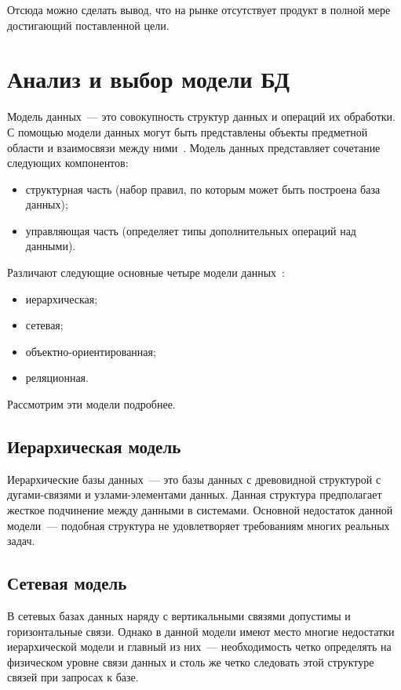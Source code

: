 Отсюда можно сделать вывод, что на рынке отсутствует продукт в полной мере достигающий поставленной цели.

\section{Анализ и выбор модели БД}%
\label{sec:analiz_i_vybor_modeli_bd}

Модель данных~--- это совокупность структур данных и операций их обработки. С помощью модели данных могут быть представлены объекты предметной области и взаимосвязи между ними~\cite{db}. Модель данных представляет сочетание следующих компонентов:
\begin{itemize}
    \item структурная часть (набор правил, по которым может быть построена база данных);
    \item управляющая часть (определяет типы дополнительных операций над данными).
\end{itemize}

Различают следующие основные четыре модели данных~\cite{db}:
\begin{itemize}
    \item иерархическая;
    \item сетевая;
    \item объектно-ориентированная;
    \item реляционная.
\end{itemize}

Рассмотрим эти модели подробнее.

\subsection{Иерархическая модель}%
\label{sub:ierarkhicheskaia_model_}

Иерархические базы данных~--- это базы данных с древовидной структурой с дугами-связями и узлами-элементами данных. Данная структура предполагает жесткое подчинение между данными в системами. Основной недостаток данной модели~--- подобная структура не удовлетворяет требованиям многих реальных задач.

\subsection{Сетевая модель}%
\label{sub:setevaia_model_}

В сетевых базах данных наряду с вертикальными связями допустимы и горизонтальные связи. Однако в данной модели имеют место многие недостатки иерархической модели и главный из них~--- необходимость четко определять на физическом уровне связи данных и столь же четко следовать этой структуре связей при запросах к базе.

